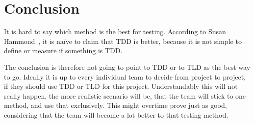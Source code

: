 \section{Conclusion}
\label{section:conclusion}
It is hard to say which method is the best for testing. According to Susan Hammond~\cite{sh2019}, it is naïve to claim that TDD is better, because it is not simple to define or measure if something is TDD.

The conclusion is therefore not going to point to TDD or to TLD as the best way to go. Ideally it is up to every individual team to decide from project to project, if they should use TDD or TLD for this project. Understandably this will not really happen, the more realistic scenario will be, that the team will stick to one method, and use that exclusively. This might overtime prove just as good, considering that the team will become a lot better to that testing method.

